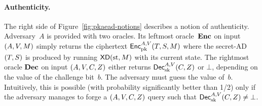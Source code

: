 
\paragraph{Authenticity. }  
The right side of Figure~\ref{fig:pkaead-notions} describes a notion of authenticity.  Adversary~$A$ is provided with two oracles.  Its leftmost oracle~$\textbf{Enc}$ on input $(A,V,M)$ simply returns the ciphertext ${\mathsf{Enc}}_{\mathrm{pk}}^{A,V}(T,S,M)$ where the secret-AD $(T,S)$ is produced by running $\mathsf{XD}(\mathrm{st},M)$ with its current state.  The rightmost oracle $\textbf{Dec}$ on input $(A,V,C,Z)$ either returns ${\mathsf{Dec}}_{\mathrm{sk}}^{A,V}(C,Z)$ or $\bot$, depending on the value of the challenge bit~$b$.  The adversary must guess the value of~$b$.  Intuitively, this is possible (with probability significantly better than 1/2) only if the adversary manages to forge a $(A,V,C,Z)$ query such that ${\mathsf{Dec}}_{\mathrm{sk}}^{A,V}(C,Z) \neq \bot$.


